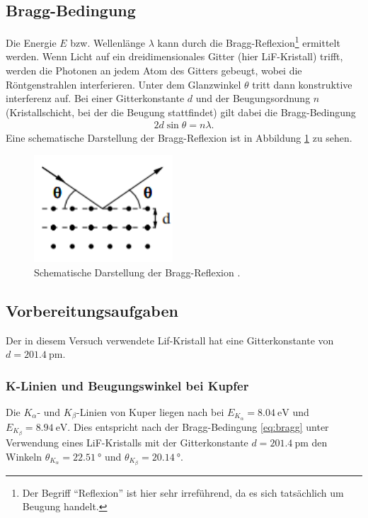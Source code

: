 \subsection{Bragg-Bedingung}
Die Energie $E$ bzw. Wellenlänge $\lambda$ kann durch die Bragg-Reflexion\footnote[2]{Der Begriff \enquote{Reflexion} ist hier sehr irreführend, da es sich tatsächlich um Beugung handelt.}
ermittelt werden.
Wenn Licht auf ein dreidimensionales Gitter (hier LiF-Kristall) trifft,
werden die Photonen an jedem Atom des Gitters gebeugt, wobei die Röntgenstrahlen interferieren.
Unter dem Glanzwinkel $\theta$ tritt dann konstruktive interferenz auf.
Bei einer Gitterkonstante $d$ und der Beugungsordnung $n$ (Kristallschicht, bei der die Beugung stattfindet) gilt dabei die Bragg-Bedingung
\begin{align}
    2 d \sin \theta = n \lambda.
    \label{eq:bragg}
\end{align}
Eine schematische Darstellung der Bragg-Reflexion ist in Abbildung \ref{fig:bragg} zu sehen.

\begin{figure}[H]
    \centering
    \includegraphics[height = 4cm]{Abbildungen/bragg.png}
    \caption[]{Schematische Darstellung der Bragg-Reflexion \cite[]{man:v602}.}
    \label{fig:bragg}
\end{figure}


\subsection{Vorbereitungsaufgaben}
Der in diesem Versuch verwendete Lif-Kristall hat eine Gitterkonstante von $d = \qty[]{201.4}{\pico\meter}$.

\subsubsection[]{K-Linien und Beugungswinkel bei Kupfer}
Die $K_\alpha$- und $K_\beta$-Linien von Kuper liegen nach \cite[]{roentgen_leifi} bei $E_{K_\alpha} = \qty[]{8.04}{\electronvolt}$
und $E_{K_\beta} = \qty[]{8.94}{\electronvolt}$.
Dies entspricht nach der Bragg-Bedingung \eqref{eq:bragg} unter Verwendung eines LiF-Kristalls mit der Gitterkonstante $d = \qty[]{201.4}{\pico\meter}$
den Winkeln $\theta_{K_\alpha} = \qty[]{22.51}{\degree}$ und $\theta_{K_\beta} = \qty[]{20.14}{\degree}$.



